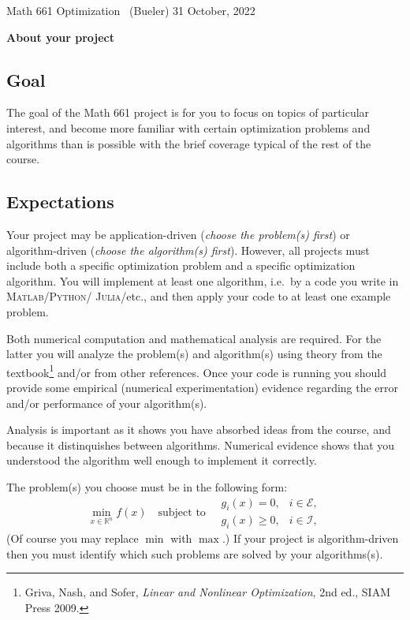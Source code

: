 \documentclass[12pt]{amsart}
\newcommand{\normalspacing}{\renewcommand{\baselinestretch}{1.05}
        \tiny\normalsize}
\newcommand{\RR}{\mathbb{R}}
\newcommand{\Matlab}{\textsc{Matlab}\xspace}
\newcommand{\Python}{\textsc{Python}\xspace}
\newcommand{\Julia}{\textsc{Julia}\xspace}
\begin{document}
\scriptsize \noindent Math 661 Optimization \, (Bueler) \hfill  31 October, 2022
\normalsize\bigskip
\normalspacing

\Large\centerline{\textbf{About your project}}
\normalsize

\bigskip\medskip
\thispagestyle{empty}
\normalspacing

\subsection*{Goal}  The goal of the Math 661 project is for you to focus on topics of particular interest, and become more familiar with certain optimization problems and algorithms than is possible with the brief coverage typical of the rest of the course.

\subsection*{Expectations}  Your project may be application-driven (\emph{choose the problem(s) first}) or algorithm-driven (\emph{choose the algorithm(s) first}).  However, all projects must include both a specific optimization problem and a specific optimization algorithm.  You will implement at least one algorithm, i.e.~by a code you write in \Matlab/\Python/ \Julia/etc., and then apply your code to at least one example problem.

Both numerical computation and mathematical analysis are required.  For the latter you will analyze the problem(s) and algorithm(s) using theory from the textbook\footnote{Griva, Nash, and Sofer, \emph{Linear and Nonlinear Optimization}, 2nd ed., SIAM Press 2009.} and/or from other references.  Once your code is running you should provide some empirical (numerical experimentation) evidence regarding the error and/or performance of your algorithm(s).

Analysis is important as it shows you have absorbed ideas from the course, and because it distinquishes between algorithms.  Numerical evidence shows that you understood the algorithm well enough to implement it correctly.

The problem(s) you choose must be in the following form:
\begin{equation}
\min_{x\in \RR^n} f(x) \quad \text{subject to} \quad \begin{matrix}
                                                      g_i(x) = 0, & i \in \mathcal{E}, \\
                                                      g_i(x) \ge 0, & i \in \mathcal{I},
                                                      \end{matrix}  \label{genform}
\end{equation}
(Of course you may replace $\min$ with $\max$.)  If your project is algorithm-driven then you must identify which such problems are solved by your algorithms(s).
\end{document}
